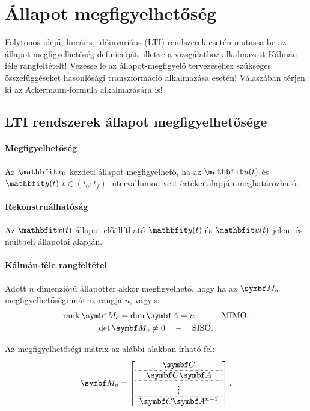 \section{Állapot megfigyelhetőség}

\begin{about}
  Folytonos idejű, lineáris, időinvariáns (LTI) rendszerek esetén mutassa be az
  állapot megfigyelhetőség definícióját, illetve a vizsgálathoz alkalmazott
  Kálmán-féle rangfeltételt! Vezesse le az állapot-megfigyelő tervezéséhez
  szükséges összefüggéseket hasonlósági transzformáció alkalmazása esetén!
  Válaszában térjen ki az Ackermann-formula alkalmazására is!
\end{about}

\subsection{LTI rendszerek állapot megfigyelhetősége}

\paragraph{Megfigyelhetőség}

Az $\rvec x_0$ kezdeti állapot megfigyelhető, ha az $\rvec u(t)$ és $\rvec y(t)$
$t \in (t_0; t_f)$ intervallumon vett értékei alapján meghatározható.

\paragraph{Rekonstruálhatóság}

Az $\rvec x(t)$ állapot előállítható $\rvec y(t)$ és $\rvec u(t)$ jelen- és
múltbeli állapotai alapján.

\paragraph{Kálmán-féle rangfeltétel}

Adott $n$ dimenziójú állapottér akkor megfigyelhető, hogy ha az $\rmat M_o$
megfigyelhetőségi mátrix rangja $n$, vagyis:
\begin{gather}
  \rank \rmat M_o = \dim \rmat A = n
  \quad - \quad \text{MIMO},
  \\
  \det \rmat M_o \neq 0
  \quad - \quad \text{SISO}.
\end{gather}

Az megfigyelhetőségi mátrix az alábbi alakban írható fel:
\bgroup
\def\arraystretch{1.2}
\begin{equation}
  \rmat M_o = \left[\begin{array}{ c }
      \rmat C         \\ \hdashline[3pt/3pt]
      \rmat C \rmat A \\ \hdashline[3pt/3pt]
      \vdots          \\ \hdashline[3pt/3pt]
      \rmat C \rmat A^{n-1}
    \end{array}\right]
  .
\end{equation}
\egroup

